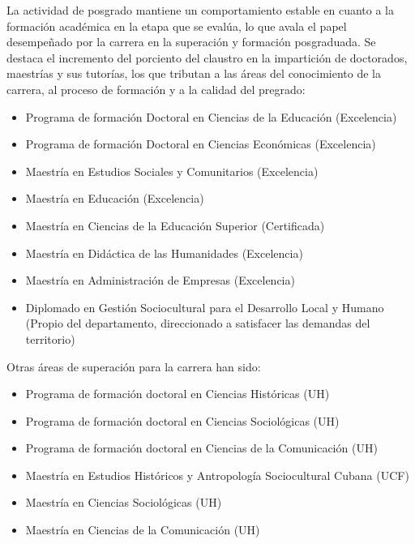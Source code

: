 La actividad de posgrado mantiene un comportamiento estable en cuanto a la formación académica en la etapa que se evalúa, lo que avala el papel desempeñado por la carrera en la superación y formación posgraduada. Se destaca el incremento del porciento del claustro en la impartición de doctorados, maestrías y sus tutorías, los que tributan a las áreas del conocimiento de la carrera, al proceso de formación y a la calidad del pregrado:

\begin{itemize}
	\item Programa de formación Doctoral en Ciencias de la Educación (Excelencia)
	\item Programa de formación Doctoral en Ciencias Económicas (Excelencia)
	\item Maestría en Estudios Sociales y Comunitarios (Excelencia)
	\item Maestría en Educación (Excelencia)
	\item Maestría en Ciencias de la Educación Superior (Certificada)
	\item Maestría en Didáctica de las Humanidades (Excelencia)
	\item Maestría en Administración de Empresas (Excelencia)
	\item Diplomado en Gestión Sociocultural para el Desarrollo Local y Humano (Propio del departamento, direccionado a satisfacer las demandas del territorio)
\end{itemize}

Otras áreas de superación para la carrera han sido:

\begin{itemize}
	\item Programa de formación doctoral en Ciencias Históricas (UH)
	\item Programa de formación doctoral en Ciencias Sociológicas (UH)
	\item Programa de formación doctoral en Ciencias de la Comunicación (UH)
	\item Maestría en Estudios Históricos y Antropología Sociocultural Cubana (UCF)
	\item Maestría en Ciencias Sociológicas (UH)
	\item Maestría en Ciencias de la Comunicación (UH)
\end{itemize}